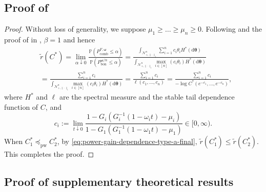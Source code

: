 \documentclass[12pt]{article}
\theoremstyle{plain}
\theoremstyle{plain}
\theoremstyle{definition}
\renewcommand{\Pr}{\mathbb{P}}
\newcommand{\intd}{\mathrm{d}}
\newcommand{\punitsphereone}[1]{\mathcal{N}_{+,\|\cdot\|_1}^{#1}}
\begin{document}
\subsection{Proof of }
\label{subsec:proof-power-gain-dependence}
\PowerGainDependence*
\begin{proof}
Without loss of generality, we suppose $\mu_1\ge\dots\ge\mu_n\ge0$.
Following  and the proof of  in , $\beta=1$ and hence
\begin{equation}
\label{eq:power-gain-dependence-type-a-final}
\begin{split}
&\tilde{r}(C^*)
=\lim_{\alpha\downarrow0}\frac{\Pr\left(P^{F,\bm{\omega}}_\mathrm{comb}\leq \alpha\right)}{\Pr\left(P^{\bm{\omega}/n}_{\mathrm{bon}}\leq \alpha\right)}
=\frac{\int_{\punitsphereone{n}}\sum_{i=1}^nc_i\theta_i H^*(\intd\bm{\theta})}{\int_{\punitsphereone{n}} \max_{i\in[n]}(c_i\theta_i)H^*(\intd\bm{\theta})}\\
&=\frac{\sum_{i=1}^nc_i}{\int_{\punitsphereone{n}} \max_{i\in[n]}(c_i\theta_i)H^*(\intd\bm{\theta})}
=\frac{\sum_{i=1}^nc_i}{\ell(c_1,\dots,c_n)}
=\frac{\sum_{i=1}^nc_i}{-\log C^*(e^{-c_1},\dots,e^{-c_n})},    
\end{split}
\end{equation}
where $H^*$ and $\ell$ are the spectral measure and the stable tail dependence function of $C$, and
\[
c_i:=\lim_{t\downarrow0}\frac{1-G_i\left(G_i^{-1}(1-\omega_i t)-\mu_i\right)}{1-G_1\left(G_1^{-1}(1-\omega_1 t)-\mu_1\right)}\in[0,\infty).
\]
When $C_1^*\preceq_{\mathrm{pw}}C_2^*$, by \eqref{eq:power-gain-dependence-type-a-final}, $\tilde{r}(C_1^*)\le \tilde{r}(C_2^*)$. This completes the proof.
\end{proof}

\subsection{Proof of supplementary theoretical results}
\label{subsec:other-theory-results}
\end{document}
